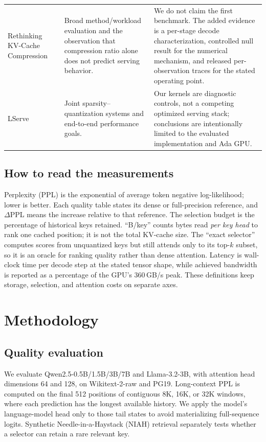 \documentclass[sigplan,anonymous,review,nonacm]{acmart}
\begin{document}
\begin{table}[t]
\begin{tabular}{p{}p{}p{}}
Rethinking KV-Cache Compression~\cite{wei2025rethinking}
& Broad method/workload evaluation and the observation that compression ratio alone
does not predict serving behavior.
& We do not claim the first benchmark. The added evidence is a per-stage decode
characterization, controlled null result for the numerical mechanism, and released
per-observation traces for the stated operating point. \\
LServe~\cite{yang2025lserve}
& Joint sparsity--quantization systems and end-to-end performance goals.
& Our kernels are diagnostic controls, not a competing optimized serving stack;
conclusions are intentionally limited to the evaluated implementation and Ada GPU. \\
\bottomrule
\end{tabular}
\end{table}

\subsection{How to read the measurements}
Perplexity (PPL) is the exponential of average token negative log-likelihood; lower is
better. Each quality table states its dense or full-precision reference, and
$\Delta$PPL means the increase relative to that reference. The selection budget is
the percentage of historical keys retained. ``B/key'' counts bytes read \emph{per key
head} to rank one cached position; it is not the total KV-cache size. The ``exact
selector'' computes scores from unquantized keys but still attends only to its top-$k$
subset, so it is an oracle for ranking quality rather than dense attention. Latency is
wall-clock time per decode step at the stated tensor shape, while achieved bandwidth
is reported as a percentage of the GPU's 360\,GB/s peak. These definitions keep
storage, selection, and attention costs on separate axes.

\section{Methodology}

\subsection{Quality evaluation}
We evaluate Qwen2.5-0.5B/1.5B/3B/7B and Llama-3.2-3B, with attention head dimensions
64 and 128, on Wikitext-2-raw and PG19. Long-context PPL is computed on the final 512
positions of contiguous 8K, 16K, or 32K windows, where each prediction has the
longest available history. We apply the model's language-model head only to those tail
states to avoid materializing full-sequence logits. Synthetic Needle-in-a-Haystack
(NIAH) retrieval separately tests whether a selector can retain a rare relevant key.
\end{document}

